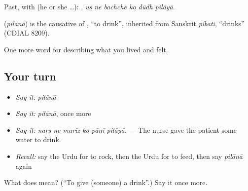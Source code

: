 Past, with  (he or she …):      , \emph{us ne bachche ko dūdh pilāyā}.

\begin{cousinweb}
\textbf{} (\emph{pilānā}) is the causative of \textbf{}, \textquotedblleft{}to drink\textquotedblright{}, inherited from Sanskrit \emph{píbati}, \textquotedblleft{}drinks\textquotedblright{} (CDIAL 8209).
\end{cousinweb}

\begin{grammarlens}[title={What you've built}]
One more word for describing what you lived and felt.
\end{grammarlens}

\subsection*{Your turn}
\begin{itemize}
\raggedright
  \item \emph{Say it:} \emph{pilānā}
  \item \emph{Say it:} \emph{pilānā}, once more
  \item \emph{Say it:} \emph{nars ne marīz ko pānī pilāyā.} — The nurse gave the patient some water to drink.
  \item \emph{Recall:} say the Urdu for to rock, then the Urdu for to feed, then say \emph{pilānā} again
\end{itemize}

\begin{tcolorbox}[breakable,colback=teal!4,colframe=teal!35!black,title={Before you move on}]
What does  mean? (\textquotedblleft{}To give (someone) a drink\textquotedblright{}.) Say it once more.
\end{tcolorbox}
